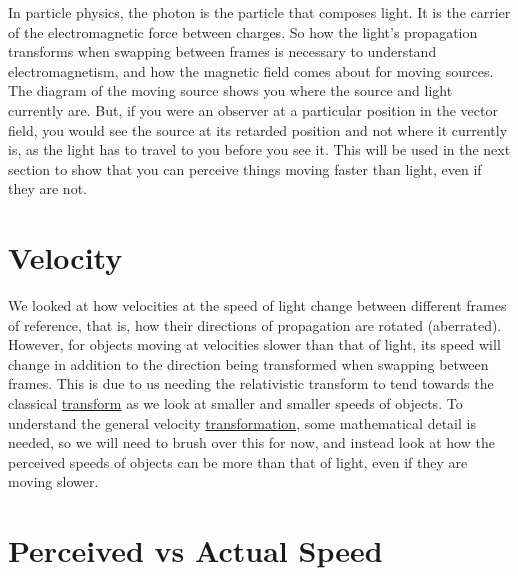 In particle physics, the photon is the particle that composes light.
It is the carrier of the electromagnetic force between charges.
So how the light's propagation transforms when swapping between frames is necessary to understand electromagnetism, and how the magnetic field comes about for moving sources.
The diagram of the moving source shows you where the source and light currently are.
But, if you were an observer at a particular position in the vector field, you would see the source at its retarded position and not where it currently is, as the light has to travel to you before you see it.
This will be used in the next section to show that you can perceive things moving faster than light, even if they are not.


\section{Velocity} \label{sect: (intro) Velocity}

We looked at how velocities at the speed of light change between different frames of reference, that is, how their directions of propagation are rotated (aberrated).
However, for objects moving at velocities slower than that of light, its speed will change in addition to the direction being transformed when swapping between frames.
This is due to us needing the relativistic transform to tend towards the classical \hyperlink{def-transform}{transform} as we look at smaller and smaller speeds of objects.
To understand the general velocity \hyperlink{def-transform}{transformation}, some mathematical detail is needed, so we will need to brush over this for now, and instead look at how the perceived speeds of objects can be more than that of light, even if they are moving slower.

\section{Perceived vs Actual Speed} \label{subsect: Perceived vs Actual Speed}

